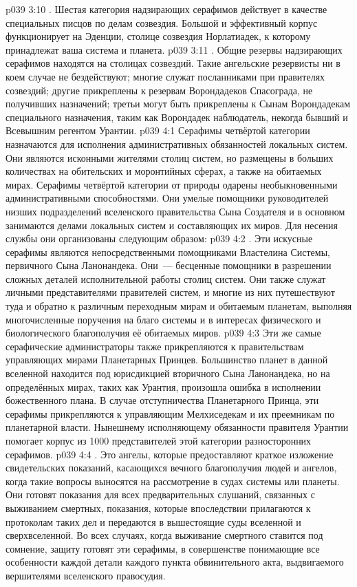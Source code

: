 \vs p039 3:10 . Шестая категория надзирающих серафимов действует в качестве специальных писцов по делам созвездия. Большой и эффективный корпус функционирует на Эденции, столице созвездия Норлатиадек, к которому принадлежат ваша система и планета.
\vs p039 3:11 . Общие резервы надзирающих серафимов находятся на столицах созвездий. Такие ангельские резервисты ни в коем случае не бездействуют; многие служат посланниками при правителях созвездий; другие прикреплены к резервам Ворондадеков Спасограда, не получивших назначений; третьи могут быть прикреплены к Сынам Ворондадекам специального назначения, таким как Ворондадек наблюдатель, некогда бывший и Всевышним регентом Урантии.
\vs p039 4:1 Серафимы четвёртой категории назначаются для исполнения административных обязанностей локальных систем. Они являются исконными жителями столиц систем, но размещены в больших количествах на обительских и моронтийных сферах, а также на обитаемых мирах. Серафимы четвёртой категории от природы одарены необыкновенными административными способностями. Они умелые помощники руководителей низших подразделений вселенского правительства Сына Создателя и в основном занимаются делами локальных систем и составляющих их миров. Для несения службы они организованы следующим образом:
\vs p039 4:2 . Эти искусные серафимы являются непосредственными помощниками Властелина Системы, первичного Сына Ланонандека. Они~--- бесценные помощники в разрешении сложных деталей исполнительной работы столиц систем. Они также служат личными представителями правителей систем, и многие из них путешествуют туда и обратно к различным переходным мирам и обитаемым планетам, выполняя многочисленные поручения на благо системы и в интересах физического и биологического благополучия её обитаемых миров.
\vs p039 4:3 Эти же самые серафические администраторы также прикрепляются к правительствам управляющих мирами Планетарных Принцев. Большинство планет в данной вселенной находится под юрисдикцией вторичного Сына Ланонандека, но на определённых мирах, таких как Урантия, произошла ошибка в исполнении божественного плана. В случае отступничества Планетарного Принца, эти серафимы прикрепляются к управляющим Мелхиседекам и их преемникам по планетарной власти. Нынешнему исполняющему обязанности правителя Урантии помогает корпус из 1000 представителей этой категории разносторонних серафимов.
\vs p039 4:4 . Это ангелы, которые предоставляют краткое изложение свидетельских показаний, касающихся вечного благополучия людей и ангелов, когда такие вопросы выносятся на рассмотрение в судах системы или планеты. Они готовят показания для всех предварительных слушаний, связанных с выживанием смертных, показания, которые впоследствии прилагаются к протоколам таких дел и передаются в вышестоящие суды вселенной и сверхвселенной. Во всех случаях, когда выживание смертного ставится под сомнение, защиту готовят эти серафимы, в совершенстве понимающие все особенности каждой детали каждого пункта обвинительного акта, выдвигаемого вершителями вселенского правосудия.
